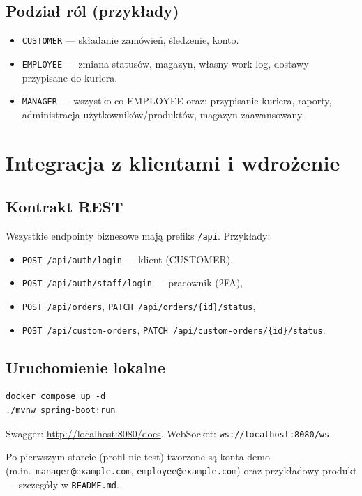 \documentclass[12pt,a4paper]{report}
\newenvironment{calosc}{%
  \Needspace{14\baselineskip}%
  \begin{samepage}%
}{%
  \end{samepage}%
}
\begin{document}
\begin{calosc}
\section{Podział ról (przykłady)}

\begin{itemize}[noitemsep]
  \item \texttt{CUSTOMER} --- składanie zamówień, śledzenie, konto.
  \item \texttt{EMPLOYEE} --- zmiana statusów, magazyn, własny work-log, dostawy przypisane do kuriera.
  \item \texttt{MANAGER} --- wszystko co EMPLOYEE oraz: przypisanie kuriera, raporty, administracja użytkowników/produktów, magazyn zaawansowany.
\end{itemize}
\end{calosc}

\chapter{Integracja z klientami i wdrożenie}

\begin{calosc}
\section{Kontrakt REST}

Wszystkie endpointy biznesowe mają prefiks \texttt{/api}. Przykłady:
\begin{itemize}[noitemsep]
  \item \texttt{POST /api/auth/login} --- klient (CUSTOMER),
  \item \texttt{POST /api/auth/staff/login} --- pracownik (2FA),
  \item \texttt{POST /api/orders}, \texttt{PATCH /api/orders/\{id\}/status},
  \item \texttt{POST /api/custom-orders}, \texttt{PATCH /api/custom-orders/\{id\}/status}.
\end{itemize}
\end{calosc}

\begin{calosc}
\section{Uruchomienie lokalne}

\begin{lstlisting}[style=shell]
docker compose up -d
./mvnw spring-boot:run
\end{lstlisting}
Swagger: \url{http://localhost:8080/docs}. WebSocket: \texttt{ws://localhost:8080/ws}.

Po pierwszym starcie (profil nie-test) tworzone są konta demo (m.in.\ \texttt{manager@example.com}, \texttt{employee@example.com}) oraz przykładowy produkt --- szczegóły w \texttt{README.md}.
\end{calosc}
\end{document}
